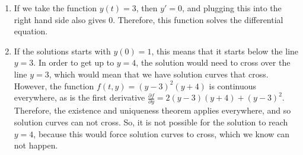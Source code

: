 \documentclass{ximera}
\begin{document}
\begin{exampleSol}
    \begin{enumerate}
        \item If we take the function $y(t) = 3$, then $y' = 0$, and plugging this into the right hand side also gives $0$. Therefore, this function solves the differential equation.
        \item If the solutions starts with $y(0) = 1$, this means that it starts below the line $y=3$. In order to get up to $y=4$, the solution would need to cross over the line $y=3$, which would mean that we have solution curves that cross. However, the function $f(t,y) = (y-3)^2(y+4)$ is continuous everywhere, as is the first derivative $\frac{\partial f}{\partial y} = 2(y-3)(y+4) + (y-3)^2.$ Therefore, the existence and uniqueness theorem applies everywhere, and so solution curves can not cross. So, it is not possible for the solution to reach $y=4$, because this would force solution curves to cross, which we know can not happen. 
    \end{enumerate}
\end{exampleSol}
\end{document}

